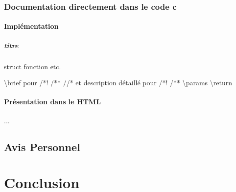 \documentclass{report}
\begin{document}
\section{Documentation directement dans le code c}{
\subsection{Implémentation}{
\subsubsection{titre}{ struct fonction etc.}}
\textbackslash brief pour /*! /** //* et description détaillé pour /*! /**
\textbackslash params
\textbackslash  return
\subsection{Présentation dans le HTML}{ ...}}
\chapter{Avis Personnel}
\part{Conclusion}
\end{document}
